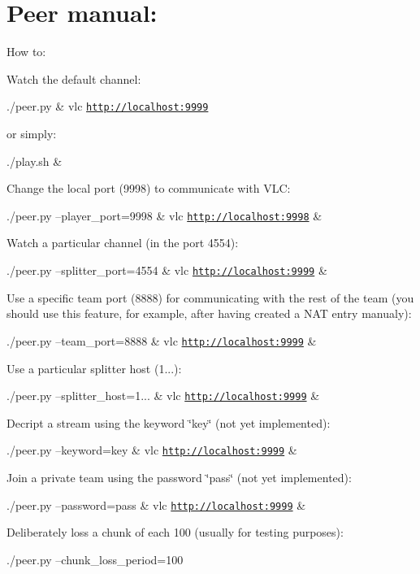 \section*{Peer manual\+:}

How to\+:


\begin{DoxyEnumerate}
\item Watch the default channel\+:

./peer.py \& vlc \href{http://localhost:9999}{\tt http\+://localhost\+:9999}
\end{DoxyEnumerate}

or simply\+: \begin{DoxyVerb}./play.sh &
\end{DoxyVerb}



\begin{DoxyEnumerate}
\item Change the local port (9998) to communicate with V\+L\+C\+:

./peer.py --player\+\_\+port=9998 \& vlc \href{http://localhost:9998}{\tt http\+://localhost\+:9998} \&
\item Watch a particular channel (in the port 4554)\+:

./peer.py --splitter\+\_\+port=4554 \& vlc \href{http://localhost:9999}{\tt http\+://localhost\+:9999} \&
\item Use a specific team port (8888) for communicating with the rest of the team (you should use this feature, for example, after having created a N\+A\+T entry manualy)\+:

./peer.py --team\+\_\+port=8888 \& vlc \href{http://localhost:9999}{\tt http\+://localhost\+:9999} \&
\item Use a particular splitter host (1...)\+:

./peer.py --splitter\+\_\+host=1... \& vlc \href{http://localhost:9999}{\tt http\+://localhost\+:9999} \&
\item Decript a stream using the keyword \char`\"{}key\char`\"{} (not yet implemented)\+:

./peer.py --keyword=key \& vlc \href{http://localhost:9999}{\tt http\+://localhost\+:9999} \&
\item Join a private team using the password \char`\"{}pass\char`\"{} (not yet implemented)\+:

./peer.py --password=pass \& vlc \href{http://localhost:9999}{\tt http\+://localhost\+:9999} \&
\item Deliberately loss a chunk of each 100 (usually for testing purposes)\+:

./peer.py --chunk\+\_\+loss\+\_\+period=100
\end{DoxyEnumerate}

